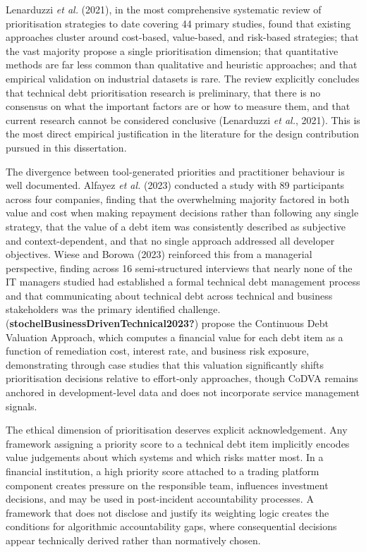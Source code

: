\documentclass[
  british,
  12pt,
  a4paper,
]{report}
\begin{document}
Lenarduzzi \emph{et al.} (2021), in the most comprehensive systematic
review of prioritisation strategies to date covering 44 primary studies,
found that existing approaches cluster around cost-based, value-based,
and risk-based strategies; that the vast majority propose a single
prioritisation dimension; that quantitative methods are far less common
than qualitative and heuristic approaches; and that empirical validation
on industrial datasets is rare. The review explicitly concludes that
technical debt prioritisation research is preliminary, that there is no
consensus on what the important factors are or how to measure them, and
that current research cannot be considered conclusive (Lenarduzzi
\emph{et al.}, 2021). This is the most direct empirical justification in
the literature for the design contribution pursued in this dissertation.

The divergence between tool-generated priorities and practitioner
behaviour is well documented. Alfayez \emph{et al.} (2023) conducted a
study with 89 participants across four companies, finding that the
overwhelming majority factored in both value and cost when making
repayment decisions rather than following any single strategy, that the
value of a debt item was consistently described as subjective and
context-dependent, and that no single approach addressed all developer
objectives. Wiese and Borowa (2023) reinforced this from a managerial
perspective, finding across 16 semi-structured interviews that nearly
none of the IT managers studied had established a formal technical debt
management process and that communicating about technical debt across
technical and business stakeholders was the primary identified
challenge. (\textbf{stochelBusinessDrivenTechnical2023?}) propose the
Continuous Debt Valuation Approach, which computes a financial value for
each debt item as a function of remediation cost, interest rate, and
business risk exposure, demonstrating through case studies that this
valuation significantly shifts prioritisation decisions relative to
effort-only approaches, though CoDVA remains anchored in
development-level data and does not incorporate service management
signals.

The ethical dimension of prioritisation deserves explicit
acknowledgement. Any framework assigning a priority score to a technical
debt item implicitly encodes value judgements about which systems and
which risks matter most. In a financial institution, a high priority
score attached to a trading platform component creates pressure on the
responsible team, influences investment decisions, and may be used in
post-incident accountability processes. A framework that does not
disclose and justify its weighting logic creates the conditions for
algorithmic accountability gaps, where consequential decisions appear
technically derived rather than normatively chosen.
\end{document}
